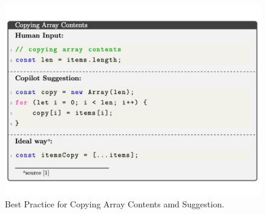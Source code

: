 \begin{figure}[hbt!]
    \centering
    \includegraphics[width=\linewidth]{Figures/bp_1.png}
    \caption{Best Practice for Copying Array Contents amd \cop{} Suggestion.}
    \label{fig:bp_1}
\end{figure}

